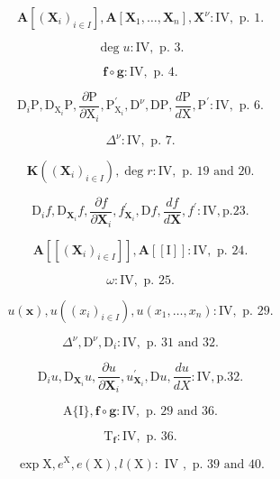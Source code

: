 
\[
\mathbf {A} \left[ \left(\mathbf {X} _ {i}\right) _ {i \in I} \right], \mathbf {A} \left[ \mathbf {X} _ {1}, \dots , \mathbf {X} _ {n} \right], \mathbf {X} ^ {\nu}: \mathrm{IV}, \text { p. } 1.
\]

\[
\deg u: \mathrm{IV}, \text { p. } 3.
\]

\[
\mathbf {f} \circ \mathbf {g}: \mathrm{IV}, \text { p. } 4.
\]

\[
\mathrm{D} _ {i} \mathrm{P}, \mathrm{D} _ {\mathrm{X} _ {i}} \mathrm{P}, \frac {\partial \mathrm{P}}{\partial \mathrm{X} _ {i}}, \mathrm{P} _ {\mathrm{X} _ {i}} ^ {\prime}, \mathrm{D} ^ {\nu}, \mathrm{DP}, \frac {d \mathrm{P}}{d \mathrm{X}}, \mathrm{P} ^ {\prime}: \mathrm{IV}, \text { p. } 6.
\]

\[
\Delta^ {\nu}: \mathrm{IV}, \text { p. } 7.
\]

\[
\mathbf {K} ((\mathbf {X} _ {i}) _ {i \in I}), \deg r: \mathrm{IV}, \text { p. } 19 \text { and } 20.
\]

\[
\mathrm{D} _ {i} f, \mathrm{D} _ {\mathbf {X} _ {i}} f, \frac {\partial f}{\partial \mathbf {X} _ {i}}, f _ {\mathbf {X} _ {i}} ^ {\prime}, \mathrm{D} f, \frac {d f}{d \mathbf {X}}, f ^ {\prime}: \mathrm{IV}, \text {p.} 23.
\]

\[
\mathbf {A} \left[ \left[ \left(\mathbf {X} _ {i}\right) _ {i \in I} \right] \right], \mathbf {A} \left[ [ \mathrm{I} ] \right]: \mathrm{IV}, \text { p. } 24.
\]

\[
\omega : \mathrm{IV}, \text { p. } 25.
\]

\[
u (\mathbf {x}), u ((x _ {i}) _ {i \in I}), u (x _ {1}, \dots , x _ {n}): \mathrm{IV}, \text { p. } 29.
\]

\[
\Delta^ {\nu}, \mathrm{D} ^ {\nu}, \mathrm{D} _ {i}: \mathrm{IV}, \text { p. } 31 \text { and } 32.
\]

\[
\mathrm{D} _ {i} u, \mathrm{D} _ {\mathbf {X} _ {i}} u, \frac {\partial u}{\partial \mathbf {X} _ {i}}, u _ {\mathbf {X} _ {i}} ^ {\prime}, \mathrm{D} u, \frac {d u}{d X}: \mathrm{IV}, \mathrm{p.32}.
\]

\[
\mathrm{A} \{\mathrm{I} \}, \mathbf {f} \circ \mathbf {g}: \mathrm{IV}, \text { p. } 29 \text { and } 36.
\]

\[
\mathrm{T} _ {\mathbf {f}}: \mathrm{IV}, \text { p. } 36.
\]

\[
\exp \mathrm{X}, e ^ {\mathrm{X}}, e (\mathrm{X}), l (\mathrm{X}): \text { IV }, \text { p. } 39 \text { and } 40.
\]

